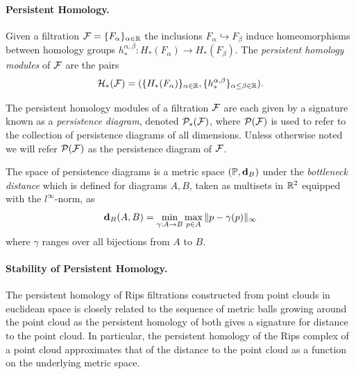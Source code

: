 \paragraph*{\textbf{Persistent Homology.}} %
\label{par:persistent_homology}

Given a filtration $\mathcal{F} = \{F_\alpha\}_{\alpha\in\mathbb{R}}$ the inclusions $F_\alpha\hookrightarrow F_\beta$ induce homeomorphisms between homology groups $h_*^{\alpha,\beta} : H_*(F_\alpha)\to H_*(F_\beta)$.
The \emph{persistent homology modules} of $\mathcal{F}$ are the pairs
\[\mathcal{H}_*(\mathcal{F}) = (\{H_*(F_\alpha)\}_{\alpha\in\mathbb{R}}, \{h_*^{\alpha,\beta}\}_{\alpha\leq\beta\in\mathbb{R}}).\]

The persistent homology modules of a filtration $\mathcal{F}$ are each given by a signature known as a \emph{persistence diagram}, denoted $\mathcal{P}_*(\mathcal{F})$, where $\mathcal{P}(\mathcal{F})$ is used to refer to the collection of persistence diagrams of all dimensions.
Unless otherwise noted we will refer $\mathcal{P}(\mathcal{F})$ as the persistence diagram of $\mathcal{F}$.

The space of persistence diagrams is a metric space $(\mathbb{P}, \mathbf{d}_B)$ under the \emph{bottleneck distance} which is defined for diagrams $A, B$, taken as multisets in $\mathbb{R}^2$ equipped with the $l^\infty$-norm, as
\[\mathbf{d}_B(A, B) = \min_{\gamma:A\to B}\max_{p\in A} \| p- \gamma(p)\|_\infty\]
where $\gamma$ ranges over all bijections from $A$ to $B$.

\paragraph*{\textbf{Stability of Persistent Homology.}} %
\label{par:stability_of_persistent}

The persistent homology of Rips filtrations constructed from point clouds in euclidean space is closely related to the sequence of metric balls growing around the point cloud as the persistent homology of both gives a signature for distance to the point cloud.
In particular, the persistent homology of the Rips complex of a point cloud approximates that of the distance to the point cloud as a function on the underlying metric space.

